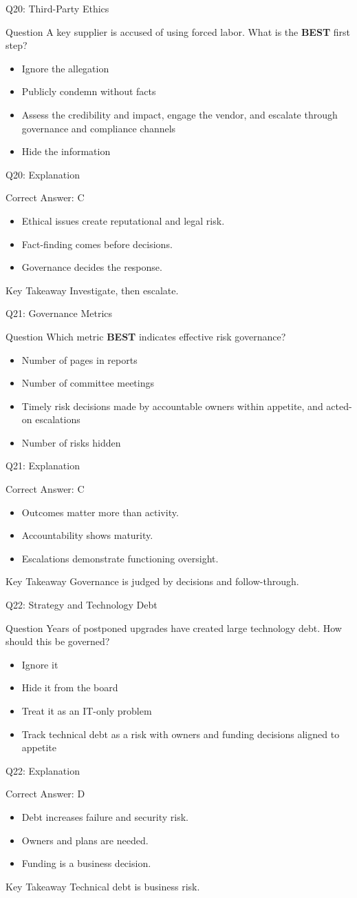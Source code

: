 \documentclass[aspectratio=169]{beamer}
\newcommand{\hq}[7]{%
	\begin{frame}{Q#1: #2}
		\begin{block}{Question}
			#3
		\end{block}
		\begin{itemize}
			#4
		\end{itemize}
	\end{frame}
	\begin{frame}{Q#1: Explanation}
		\begin{block}{Correct Answer: #5}
			\begin{itemize}
				#6
			\end{itemize}
		\end{block}
		\begin{alertblock}{Key Takeaway}
			#7
		\end{alertblock}
	\end{frame}
}
\begin{document}
	\hq{20}{Third-Party Ethics}
	{A key supplier is accused of using forced labor. What is the \textbf{BEST} first step?}
	{\item[\textbf{(A)}] Ignore the allegation
		\item[\textbf{(B)}] Publicly condemn without facts
		\item[\textbf{(C)}] Assess the credibility and impact, engage the vendor, and escalate through governance and compliance channels
		\item[\textbf{(D)}] Hide the information}
	{C}
	{\item Ethical issues create reputational and legal risk.
		\item Fact-finding comes before decisions.
		\item Governance decides the response.}
	{Investigate, then escalate.}

	\hq{21}{Governance Metrics}
	{Which metric \textbf{BEST} indicates effective risk governance?}
	{\item[\textbf{(A)}] Number of pages in reports
		\item[\textbf{(B)}] Number of committee meetings
		\item[\textbf{(C)}] Timely risk decisions made by accountable owners within appetite, and acted-on escalations
		\item[\textbf{(D)}] Number of risks hidden}
	{C}
	{\item Outcomes matter more than activity.
		\item Accountability shows maturity.
		\item Escalations demonstrate functioning oversight.}
	{Governance is judged by decisions and follow-through.}

	\hq{22}{Strategy and Technology Debt}
	{Years of postponed upgrades have created large technology debt. How should this be governed?}
	{\item[\textbf{(A)}] Ignore it
		\item[\textbf{(B)}] Hide it from the board
		\item[\textbf{(C)}] Treat it as an IT-only problem
		\item[\textbf{(D)}] Track technical debt as a risk with owners and funding decisions aligned to appetite}
	{D}
	{\item Debt increases failure and security risk.
		\item Owners and plans are needed.
		\item Funding is a business decision.}
	{Technical debt is business risk.}
\end{document}
